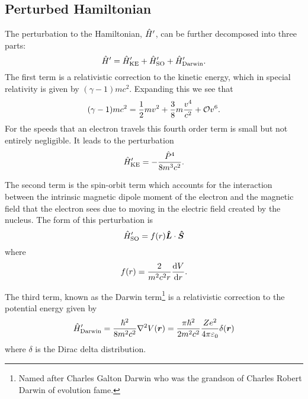     \subsection{Perturbed Hamiltonian}
    The perturbation to the Hamiltonian, \(\hat{H}'\), can be further decomposed into three parts:
    \[\hat{H}' = \hat{H}'_{\mathrm{KE}} + \hat{H}'_{\mathrm{SO}} + \hat{H}'_{\mathrm{Darwin}}.\]
    The first term is a relativistic correction to the kinetic energy, which in special relativity is given by \((\gamma - 1)mc^2\).
    Expanding this we see that
    \[(\gamma - 1)mc^2 = \frac{1}{2}mv^2 + \frac{3}{8}m\frac{v^4}{c^2} + \mathcal{O}{v^6}.\]
    For the speeds that an electron travels this fourth order term is small but not entirely negligible.
    It leads to the perturbation
    \[\hat{H}'_{\mathrm{KE}} = -\frac{\hat{P}^4}{8m^3c^2}.\]
    
    The second term is the spin-orbit term which accounts for the interaction between the intrinsic magnetic dipole moment of the electron and the magnetic field that the electron sees due to moving in the electric field created by the nucleus.
    The form of this perturbation is
    \[\hat{H}'_{\mathrm{SO}} = f(r)\bm{\hat{L}}\cdot\bm{\hat{S}}\]
    where
    \[f(r) = \frac{2}{m^2c^2r}\dv{V}{r}.\]
    
    The third term, known as the Darwin term\footnote{Named after Charles Galton Darwin who was the grandson of Charles Robert Darwin of evolution fame.} is a relativistic correction to the potential energy given by
    \[\hat{H}'_{\mathrm{Darwin}} = \frac{\hbar^2}{8m^2c^2}\nabla^2 V(\bm{r}) = \frac{\pi\hbar^2}{2m^2c^2}\frac{Ze^2}{4\pi\varepsilon_0}\delta(\bm{r})\]
    where \(\delta\) is the Dirac delta distribution.
    
